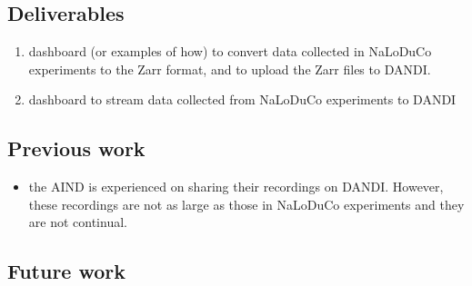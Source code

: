 
\subsection{Deliverables}

\begin{enumerate}

    \item dashboard (or examples of how) to convert data collected in NaLoDuCo experiments to the Zarr format, and to upload the Zarr files to DANDI.

    \item dashboard to stream data collected from NaLoDuCo experiments to DANDI

\end{enumerate}

\subsection{Previous work}

\begin{itemize}

    \item the AIND is experienced on sharing their recordings on DANDI.
    However, these recordings are not as large as those in NaLoDuCo experiments
    and they are not continual.

\end{itemize}

\subsection{Future work}

